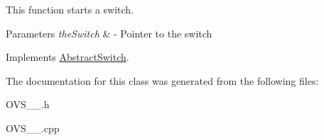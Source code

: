 \-This function starts a switch. 


\begin{DoxyParams}{\-Parameters}
{\em the\-Switch} & -\/ \-Pointer to the switch \\
\hline
\end{DoxyParams}


\-Implements \hyperlink{classAbstractSwitch_af520e5d2dde92c356449f499651cdf54}{\-Abstract\-Switch}.



\-The documentation for this class was generated from the following files\-:\begin{DoxyCompactItemize}
\item 
\-O\-V\-S\-\_\-\_.\-h\item 
\-O\-V\-S\-\_\-\_.\-cpp\end{DoxyCompactItemize}
